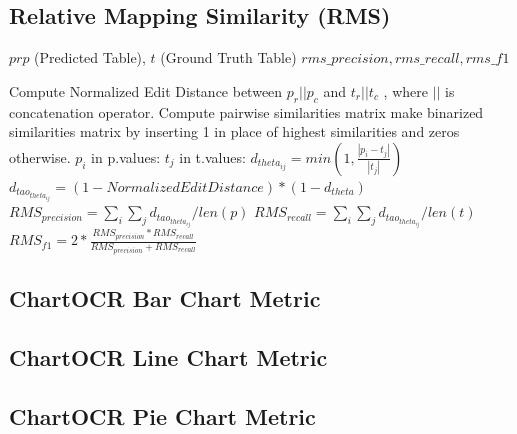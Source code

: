 \documentclass[
	letterpaper, %
]{jdf}
\begin{document}
\subsection{Relative Mapping Similarity (RMS)}\label{app:rms-algorithm}
\begin{algorithm}
    \begin{algorithmic}[1]
 \Require $prp$ (Predicted Table), $t$ (Ground Truth Table)
        \Ensure $rms\_precision, rms\_recall, rms\_f1$

        Compute Normalized Edit Distance between $p_r || p_c$ and $t_r || t_c$
    , where $||$ is concatenation operator.
        Compute pairwise similarities matrix
        make binarized similarities matrix by inserting 1 in place of highest similarities and zeros otherwise.
        \For $p_i$ in p.values:
        \For $t_j$ in t.values:
        $d_{theta_{ij}} = min(1, \frac{|p_i - t_j|}{|t_j|})$
        $d_{tao_{theta_{ij}}} = (1-Normalized Edit Distance) * (1-d_{theta})$
        \EndFor
        \EndFor
        $RMS_{precision} = \sum_{i} \sum_j d_{tao_{theta_{ij}}} / len(p)$
        $RMS_{recall} = \sum_{i} \sum_j d_{tao_{theta_{ij}}} / len(t)$
        $RMS_{f1} = 2 * \frac{RMS_{precision} * RMS_{recall}}{RMS_{precision} + RMS_{recall}}$
    \end{algorithmic}
\end{algorithm}
\subsection{ChartOCR Bar Chart Metric}
\subsection{ChartOCR Line Chart Metric}
\subsection{ChartOCR Pie Chart Metric}
\end{document}
